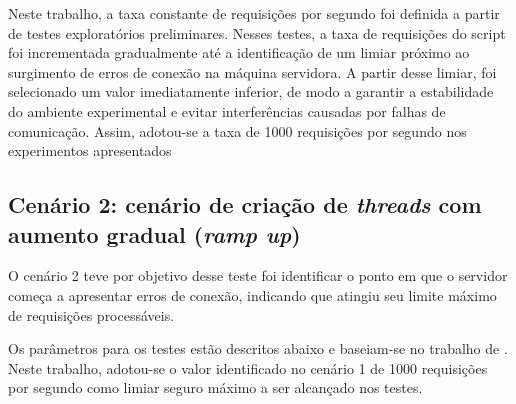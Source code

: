 \documentclass[12pt, openright, oneside, a4paper, english,	french,	spanish, brazil	]{abntex2}
\begin{document}
    Neste trabalho, a taxa constante de requisições por segundo foi definida a partir de testes exploratórios preliminares. Nesses testes, a taxa de requisições do script foi incrementada gradualmente até a identificação de um limiar próximo ao surgimento de erros de conexão na máquina servidora. A partir desse limiar, foi selecionado um valor imediatamente inferior, de modo a garantir a estabilidade do ambiente experimental e evitar interferências causadas por falhas de comunicação. Assim, adotou-se a taxa de 1000 requisições por segundo nos experimentos apresentados

    \subsection {Cenário 2: cenário de criação de \textit{threads} com aumento gradual (\textit{ramp up})}

    O cenário 2 teve por objetivo desse teste foi identificar o ponto em que o servidor começa a apresentar erros de conexão, indicando que atingiu seu limite máximo de requisições processáveis. 

   Os parâmetros para os testes estão descritos abaixo e baseiam-se no trabalho de \cite{GustafssonPersson2024}. Neste trabalho, adotou-se o valor identificado no cenário 1 de 1000 requisições por segundo  como limiar seguro máximo a ser alcançado nos testes. 
\end{document}
